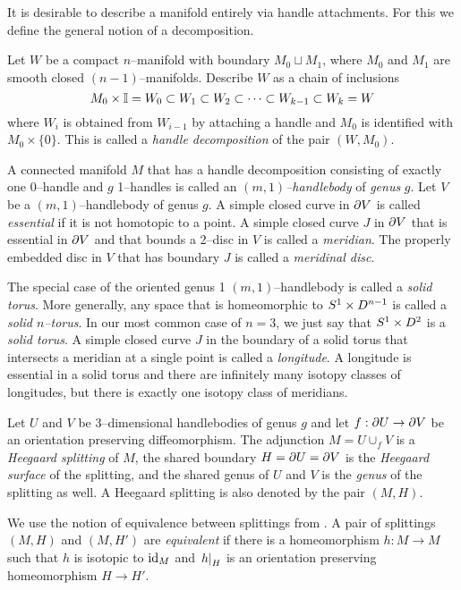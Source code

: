 It is desirable to describe a manifold entirely via handle attachments.
For this we define the general notion of a decomposition.

\begin{defn}
	\label{def:morsehandle}
	Let $W$ be a compact $n$--manifold with boundary $M_0\sqcup M_1$, where $M_0$ and $M_1$ are smooth closed $(n-1)$--manifolds.
	Describe $W$ as a chain of inclusions
	\[
	M_0 \times\mathbb{I} = W_0 \subset W_1 \subset W_2 \subset \cdots \subset W_{k-1} \subset W_k = W
	\]
	where $W_i$ is obtained from $W_{i-1}$ by attaching a handle and $M_0$ is identified with $M_0\times \{0\}$.
	This is called a \emph{handle decomposition} of the pair $(W,M_0)$.
\end{defn}

\begin{defn}
	A connected manifold $M$ that has a handle decomposition consisting of exactly one 0--handle and $g$ 1--handles is called an \emph{$(m,1)$--handlebody} of \emph{genus} $g$.
	Let $V$ be a $(m,1)$--handlebody of genus $g$.
	A simple closed curve in $\partial V$ is called \emph{essential} if it is not homotopic to a point.
	A simple closed curve $J$ in $\partial V$ that is essential in $\partial V$ and that bounds a 2--disc in $V$ is called a \emph{meridian}.
	The properly embedded disc in $V$ that has boundary $J$ is called a \emph{meridinal disc}.
	
	The special case of the oriented genus 1 $(m,1)$--handlebody is called a \emph{solid torus}.
	More generally, any space that is homeomorphic to $S^1\times D^{n-1}$ is called a \emph{solid $n$--torus}.
	In our most common case of $n=3$, we just say that $S^1\times D^2$ is a \emph{solid torus}.
	A simple closed curve $J$ in the boundary of a solid torus that intersects a meridian at a single point is called a \emph{longitude}.
	A longitude is essential in a solid torus and there are infinitely many isotopy classes of longitudes, but there is exactly one isotopy class of meridians.
\end{defn}

\begin{defn}	
	Let $U$ and $V$ be 3--dimensional handlebodies of genus $g$ and let $f:\partial U\to \partial V$ be an orientation preserving diffeomorphism.
	The adjunction $M=U\cup_f V$ is a \emph{Heegaard splitting} of $M$, the shared boundary $H = \partial U = \partial V$ is the \emph{Heegaard surface} of the splitting, and the shared genus of $U$ and $V$ is the \emph{genus} of the splitting as well.
	A Heegaard splitting is also denoted by the pair $(M,H)$.
	
	We use the notion of equivalence between splittings from \cite{SchlWald}.
	A pair of splittings $(M,H)$ and $(M,H')$ are \emph{equivalent} if there is a homeomorphism $h:M\to M$ such that $h$ is isotopic to $\textrm{id}_{M}$ and $\left.h\right|_{H}$ is an orientation preserving homeomorphism $H\to H'$.
\end{defn}

